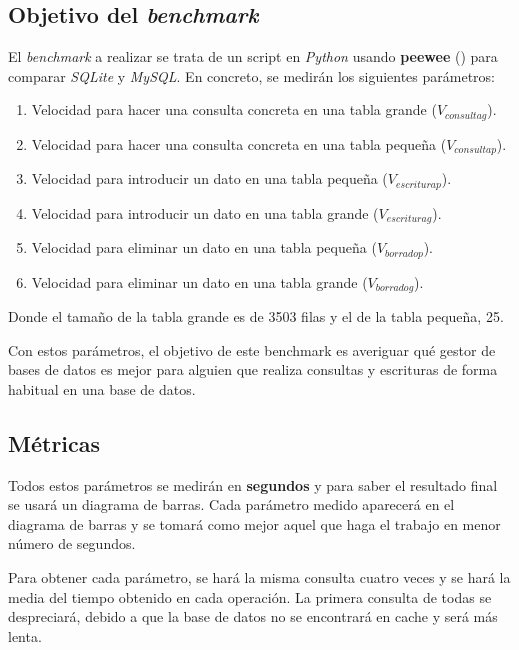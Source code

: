 \documentclass[10pt,a4paper,spanish]{article}
\numberwithin{equation}{section} %
\numberwithin{figure}{section} %
\numberwithin{table}{section} %
\begin{document}
\subsection{Objetivo del \textit{benchmark}}
El \textit{benchmark} a realizar se trata de un script en \textit{Python} usando \textbf{peewee} (\cite{intropeewee}) para comparar \textit{SQLite} y \textit{MySQL}. En concreto, se medirán los siguientes parámetros:
\begin{enumerate}[$\bullet$]
    \item Velocidad para hacer una consulta concreta en una tabla grande ($V_{consultag}$).
    \item Velocidad para hacer una consulta concreta en una tabla pequeña ($V_{consultap}$).
    \item Velocidad para introducir un dato en una tabla pequeña ($V_{escriturap}$).
    \item Velocidad para introducir un dato en una tabla grande ($V_{escriturag}$).
    \item Velocidad para eliminar un dato en una tabla pequeña ($V_{borradop}$).
    \item Velocidad para eliminar un dato en una tabla grande ($V_{borradog}$).
\end{enumerate}

Donde el tamaño de la tabla grande es de 3503 filas y el de la tabla pequeña, 25.

Con estos parámetros, el objetivo de este benchmark es averiguar qué gestor de bases de datos es mejor para alguien que realiza consultas y escrituras de forma habitual en una base de datos.

\subsection{Métricas}
Todos estos parámetros se medirán en \textbf{segundos} y para saber el resultado final se usará un diagrama de barras. Cada parámetro medido aparecerá en el diagrama de barras y se tomará como mejor aquel que haga el trabajo en menor número de segundos.

Para obtener cada parámetro, se hará la misma consulta cuatro veces y se hará la media del tiempo obtenido en cada operación. La primera consulta de todas se despreciará, debido a que la base de datos no se encontrará en cache y será más lenta.
\end{document}
